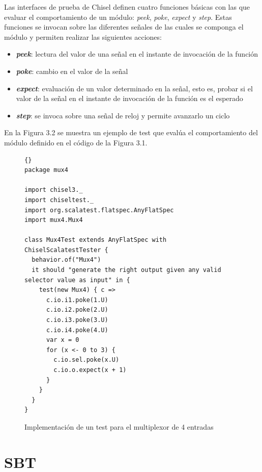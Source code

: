 Las interfaces de prueba de Chisel definen cuatro funciones básicas con las que evaluar el comportamiento de un módulo: \textit{peek}, \textit{poke},  \textit{expect} y \textit{step}. Estas funciones se invocan sobre las diferentes señales de las cuales se componga el módulo y permiten realizar las siguientes acciones:

\begin{itemize}
  \item \textbf{\textit{peek}}: lectura del valor de una señal en el instante de invocación de la función
  \vspace{-0.2cm}
  \item \textbf{\textit{poke}}: cambio en el valor de la señal
  \vspace{-0.2cm}
  \item \textbf{\textit{expect}}: evaluación de un valor determinado en la señal, esto es, probar si el valor de la señal en el instante de invocación de la función es el esperado
  \vspace{-0.2cm}
  \item \textbf{\textit{step}}: se invoca sobre una señal de reloj y permite avanzarlo un ciclo
\end{itemize}

En la Figura 3.2 se muestra un ejemplo de test que evalúa el comportamiento del módulo definido en el código de la Figura 3.1.

\begin{figure}
\begin{lstlisting}[style=scalaStyle]{}
package mux4

import chisel3._
import chiseltest._
import org.scalatest.flatspec.AnyFlatSpec
import mux4.Mux4

class Mux4Test extends AnyFlatSpec with ChiselScalatestTester {
  behavior.of("Mux4")
  it should "generate the right output given any valid selector value as input" in {
    test(new Mux4) { c =>
      c.io.i1.poke(1.U)
      c.io.i2.poke(2.U)
      c.io.i3.poke(3.U)
      c.io.i4.poke(4.U)
      var x = 0
      for (x <- 0 to 3) {
        c.io.sel.poke(x.U)
        c.io.o.expect(x + 1)
      }
    }
  }
}
\end{lstlisting}
\caption{Implementación de un test para el multiplexor de 4 entradas}
\end{figure}


\section{SBT}

